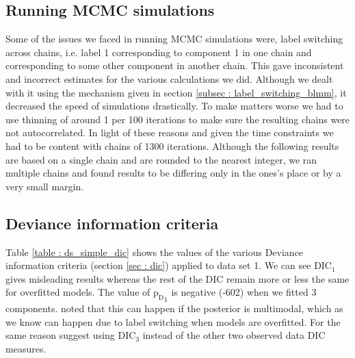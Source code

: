 \subsection{Running MCMC simulations}
Some of the issues we faced in running MCMC simulations were, label switching across chains, i.e. label 1 corresponding to component 1 in one chain and corresponding to some other component in another chain. This gave inconsistent and incorrect estimates for the various calculations we did. Although we dealt with it using the mechanism given in section \ref{subsec : label_switching_blmm}, it decreased the speed of simulations drastically. To make matters worse we had to use thinning of around 1 per 100 iterations to make sure the resulting chains were not autocorrelated. In light of these reasons and given the time constraints we had to be content with chains of 1300 iterations. Although the following results are based on a single chain and are rounded to the nearest integer, we ran multiple chains and found results to be differing only in the ones's place or by a very small margin.

\subsection{Deviance information criteria}
\label{subsec : dic_simulation_results}
Table \ref{table : ds_simple_dic} shows the values of the various Deviance information criteria (section \ref{sec : dic}) applied to data set 1. We can see $\text{DIC}_1$ gives misleading results whereas the rest of the DIC remain more or less the same for overfitted models. The value of ${\text{p}_\text{D}}_1$ is negative (-602) when we fitted 3 components. \citet[pg. 161]{lunn_bugs_2012} noted that this can happen if the posterior is multimodal, which as we know can happen due to label switching when models are overfitted. For the same reason \citet{celeux_deviance_2006} suggest using $\text{DIC}_3$ instead of the other two observed data DIC measures.\\

